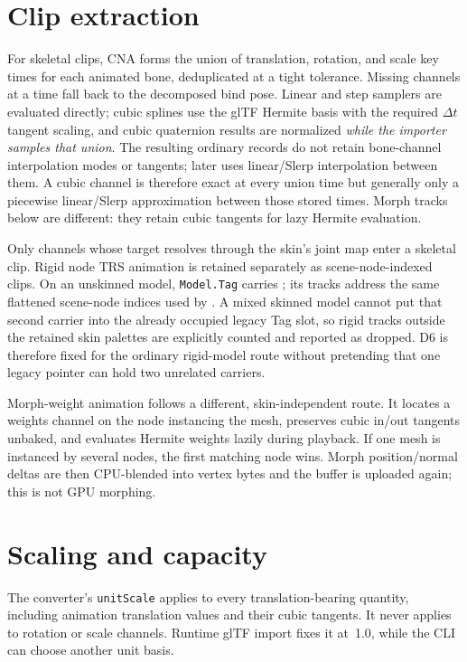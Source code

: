 \section{Clip extraction}

For skeletal clips, CNA forms the union of translation, rotation, and scale key times for each
animated bone, deduplicated at a tight tolerance. Missing channels at a time fall back to the
decomposed bind pose. Linear and step samplers are evaluated directly; cubic splines use the
glTF Hermite basis with the required $\Delta t$ tangent scaling, and cubic quaternion results
are normalized \emph{while the importer samples that union}. The resulting ordinary
 records do not retain bone-channel interpolation modes or tangents;
 later uses linear/Slerp interpolation between them. A cubic channel is
therefore exact at every union time but generally only a piecewise linear/Slerp approximation
between those stored times. Morph tracks below are different: they retain cubic tangents for lazy
Hermite evaluation.

Only channels whose target resolves through the skin's joint map enter a skeletal clip. Rigid
node TRS animation is retained separately as scene-node-indexed clips. On an unskinned model,
\texttt{Model.Tag} carries ; its tracks address the same flattened
scene-node indices used by . A mixed skinned model cannot put that second
carrier into the already occupied legacy Tag slot, so rigid tracks outside the retained skin
palettes are explicitly counted and reported as dropped. D6 is therefore fixed for the ordinary
rigid-model route without pretending that one legacy pointer can hold two unrelated carriers.

Morph-weight animation follows a different, skin-independent route. It locates a weights
channel on the node instancing the mesh, preserves cubic in/out tangents unbaked, and evaluates
Hermite weights lazily during playback. If one mesh is instanced by several nodes, the first
matching node wins. Morph position/normal deltas are then CPU-blended into vertex bytes and the
buffer is uploaded again; this is not GPU morphing.

\section{Scaling and capacity}

The converter's \texttt{unitScale} applies to every translation-bearing quantity, including
animation translation values and their cubic tangents. It never applies to rotation or scale
channels. Runtime glTF import fixes it at~1.0, while the CLI can choose another unit basis.


